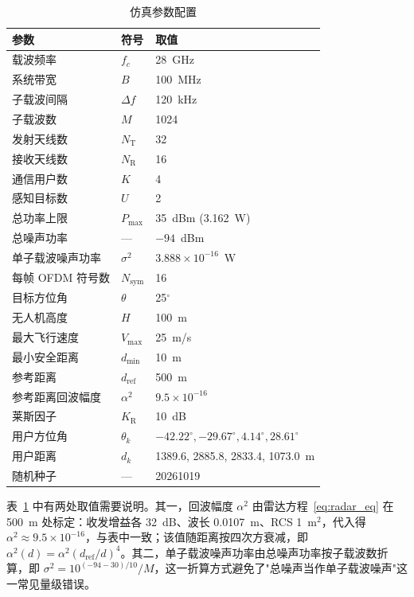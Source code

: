 \begin{table}[htbp]
  \centering
  \caption{仿真参数配置}
  \label{tab:sim_params}
  \begin{tabular}{lll}
    \toprule
    参数 & 符号 & 取值 \\
    \midrule
    载波频率 & $f_{c}$ & 28~GHz \\
    系统带宽 & $B$ & 100~MHz \\
    子载波间隔 & $\Delta f$ & 120~kHz \\
    子载波数 & $M$ & 1024 \\
    发射天线数 & $N_{\mathrm{T}}$ & 32 \\
    接收天线数 & $N_{\mathrm{R}}$ & 16 \\
    通信用户数 & $K$ & 4 \\
    感知目标数 & $U$ & 2 \\
    总功率上限 & $P_{\max}$ & 35~dBm (3.162~W) \\
    总噪声功率 & — & $-94$~dBm \\
    单子载波噪声功率 & $\sigma^{2}$ & $3.888\times10^{-16}$~W \\
    每帧 OFDM 符号数 & $N_{\mathrm{sym}}$ & 16 \\
    目标方位角 & $\theta$ & 25$^{\circ}$ \\
    无人机高度 & $H$ & 100~m \\
    最大飞行速度 & $V_{\max}$ & 25~m/s \\
    最小安全距离 & $d_{\min}$ & 10~m \\
    参考距离 & $d_{\mathrm{ref}}$ & 500~m \\
    参考距离回波幅度 & $\alpha^{2}$ & $9.5\times10^{-16}$ \\
    莱斯因子 & $K_{\mathrm{R}}$ & 10~dB \\
    用户方位角 & $\theta_{k}$ & $-42.22^{\circ},-29.67^{\circ},4.14^{\circ},28.61^{\circ}$ \\
    用户距离 & $d_{k}$ & 1389.6, 2885.8, 2833.4, 1073.0~m \\
    随机种子 & — & 20261019 \\
    \bottomrule
  \end{tabular}
\end{table}

表~\ref{tab:sim_params} 中有两处取值需要说明。其一，回波幅度 $\alpha^{2}$ 由雷达方程~\eqref{eq:radar_eq} 在 500~m 处标定：收发增益各 32~dB、波长 0.0107~m、RCS 1~m$^{2}$，代入得 $\alpha^{2}\approx9.5\times10^{-16}$，与表中一致；该值随距离按四次方衰减，即 $\alpha^{2}(d)=\alpha^{2}(d_{\mathrm{ref}}/d)^{4}$。其二，单子载波噪声功率由总噪声功率按子载波数折算，即 $\sigma^{2}=10^{(-94-30)/10}/M$，这一折算方式避免了"总噪声当作单子载波噪声"这一常见量级错误。

